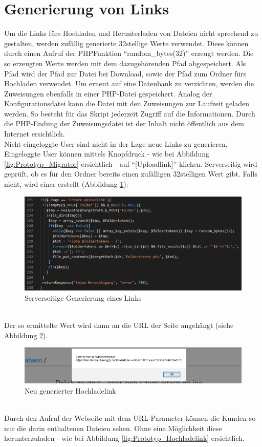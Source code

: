 \section{Generierung von Links}
Um die Links fürs Hochladen und Herunterladen von Dateien nicht sprechend zu gestalten, werden zufällig generierte 32stellige Werte verwendet.
Diese können durch einen Aufruf der PHP\-Funktion ``random\_bytes(32)'' erzeugt werden.
Die so erzeugten Werte werden mit dem dazugehörenden Pfad abgespeichert. Als Pfad wird der Pfad zur Datei bei Download, 
sowie der Pfad zum Ordner fürs Hochladen verwendet.
Um erneut auf eine Datenbank zu verzichten, werden die Zuweisungen ebenfalls in einer PHP-Datei gespeichert.
Analog der Konfigurationsdatei kann die Datei mit den Zuweisungen zur Laufzeit geladen werden. So besteht für das Skript jederzeit Zugriff auf die Informationen.
Durch die PHP-Endung der Zuweisungsdatei ist der Inhalt nicht öffentlich aus dem Internet ersichtlich.
\\
Nicht eingeloggte User sind nicht in der Lage neue Links zu generieren. 
Eingeloggte User können mittels Knopfdruck - wie bei Abbildung \ref{fig:Prototyp_Migrator} ersichtlich - auf ``[Uploadlink]'' klicken. 
Serverseitig wird geprüft, ob es für den Ordner bereits einen zufälligen 32stelligen Wert gibt. Falls nicht, wird einer erstellt (Abbildung \ref{fig:Srv_newLink}):
\begin{figure}[!h]
    \centering
    \includegraphics[width=0.9\linewidth]{content/images/prototyp_tokens.png}
    \caption{Serverseitige Generierung eines Links}
    \label{fig:Srv_newLink}
\end{figure}
  \\
Der so ermittelte Wert wird dann an die URL der Seite angehängt (siehe Abbildung \ref{fig:Hochladelink_prototyp}).
\begin{figure}[!h]
    \centering
    \includegraphics[width=1\linewidth]{content/images/prototyp_uploadtoken.png}
    \caption{Neu generierter Hochladelink}
    \label{fig:Hochladelink_prototyp}
\end{figure}
  \\
Durch den Aufruf der Webseite mit dem URL-Parameter können die Kunden so nur die darin enthaltenen Dateien sehen. 
Ohne eine Möglichkeit diese herunterzuladen - wie bei Abbildung \ref{fig:Prototyp_Hochladelink} ersichtlich.


